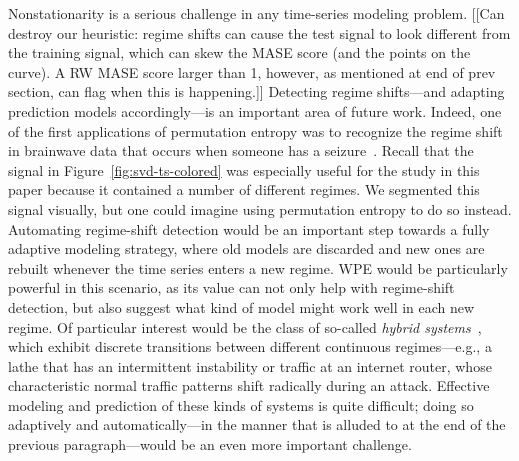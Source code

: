 Nonstationarity is a serious challenge in any time-series modeling
problem.  [[Can destroy our heuristic: regime shifts can cause the
    test signal to look different from the training signal, which can
    skew the MASE score (and the points on the curve).  A RW MASE
    score larger than 1, however, as mentioned at end of prev section,
    can flag when this is happening.]]  Detecting regime shifts---and
adapting prediction models accordingly---is an important area of
future work.  Indeed, one of the first applications of permutation
entropy was to recognize the regime shift in brainwave data that
occurs when someone has a seizure~\cite{cao2004det}.  Recall that the
signal in Figure~\ref{fig:svd-ts-colored} was especially useful for
the study in this paper because it contained a number of different
regimes.  We segmented this signal visually, but one could imagine
using permutation entropy to do so instead.  Automating regime-shift
detection would be an important step towards a fully adaptive modeling
strategy, where old models are discarded and new ones are rebuilt
whenever the time series enters a new regime.  WPE would be
particularly powerful in this scenario, as its value can not only help
with regime-shift detection, but also suggest what kind of model might
work well in each new regime.  Of particular interest would be the
class of so-called \emph{hybrid systems}~\cite{hybrid}, which exhibit
discrete transitions between different continuous regimes---e.g., a
lathe that has an intermittent instability or traffic at an internet
router, whose characteristic normal traffic patterns shift radically
during an attack.  Effective modeling and prediction of these kinds of
systems is quite difficult; doing so adaptively and automatically---in
the manner that is alluded to at the end of the previous
paragraph---would be an even more important challenge.



